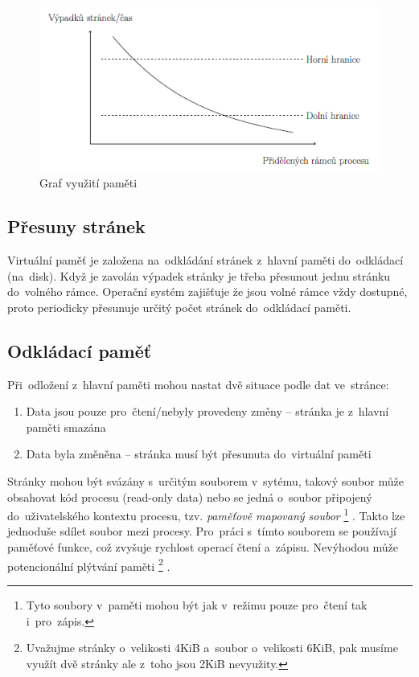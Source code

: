 \begin{figure}[ht]
	\centering
	\includegraphics[scale=1]{images/mem_freq_page.png}
	\caption{Graf využití paměti}
	\label{mem_freq_page}
\end{figure}

\subsection{Přesuny stránek}

Virtuální paměť je založena na~odkládání stránek z~hlavní paměti do~odkládací (na~disk). Když je zavolán výpadek stránky je třeba přesunout jednu stránku do~volného rámce. Operační systém zajišťuje že jsou volné rámce vždy dostupné, proto periodicky přesunuje určitý počet stránek do~odkládací paměti.

\subsection{Odkládací paměť}

Při~odložení z~hlavní paměti mohou nastat dvě situace podle dat ve~stránce:

\begin{enumerate}[noitemsep]
	\item Data jsou pouze pro~čtení/nebyly provedeny změny -- stránka je z~hlavní paměti smazána
	\item Data byla změněna -- stránka musí být přesunuta do~virtuální paměti
\end{enumerate}

Stránky mohou být svázány s~určitým souborem v~sytému, takový soubor může obsahovat kód procesu (read-only data) nebo se jedná o~soubor připojený do~uživatelského kontextu procesu, tzv. \emph{paměťově mapovaný soubor}%
\footnote{Tyto soubory v~paměti mohou být jak v~režimu pouze pro~čtení tak i~pro~zápis.}%
. Takto lze jednoduše sdílet soubor mezi procesy. Pro~práci s~tímto souborem se používají paměťové funkce, což zvyšuje rychlost operací čtení a~zápisu. Nevýhodou může potencionální plýtvání paměti%
\footnote{Uvažujme stránky o~velikosti 4KiB a~soubor o~velikosti 6KiB, pak musíme využít dvě stránky ale z~toho jsou 2KiB nevyužity.}%
.

